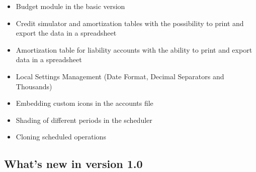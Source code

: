 \begin{itemize}

\item Budget module in the basic version

\item Credit simulator and amortization tables with the possibility to print and export the data in a spreadsheet

\item Amortization table for liability accounts with the ability to print and export data in a spreadsheet

\item Local Settings Management (Date Format, Decimal Separators and Thousands)

\item Embedding custom icons in the accounts file

\item Shading of different periods in the scheduler

\item Cloning scheduled operations

\end{itemize}


\newpage

\subsection{What's new in version 1.0}

